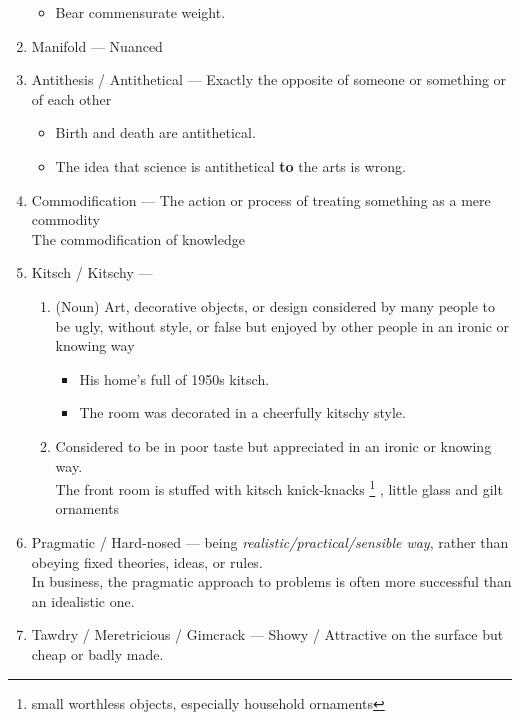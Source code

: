 \documentclass[oneside]{book}
\begin{document}
\begin{enumerate}
\begin{itemize}
        \item Bear commensurate weight.
    \end{itemize}
    \item Manifold --- Nuanced
    \item Antithesis / Antithetical --- Exactly the opposite of someone or something or of each other 
    \footnotesize \begin{itemize}
        \item Birth and death are antithetical.
        \item The idea that science is antithetical \textbf{to} the arts is wrong.
        \end{itemize} \normalsize
        \item Commodification --- The action or process of treating something as a mere commodity\\
        \footnotesize The commodification of knowledge \normalsize
        \item Kitsch / Kitschy --- 
        \begin{enumerate} \normalsize
            \item (Noun) Art, decorative objects, or design considered by many people to be ugly, without style, or false but enjoyed by other people in an ironic or knowing way\\
            \footnotesize \begin{itemize}
                \item His home's full of 1950s kitsch.
                \item The room was decorated in a cheerfully kitschy style.
            \end{itemize} \normalsize
            \item Considered to be in poor taste but appreciated in an ironic or knowing way.\\
            \footnotesize The front room is stuffed with kitsch knick-knacks \footnote{small worthless objects, especially household ornaments} , little glass and gilt ornaments \normalsize
        \end{enumerate}
        \item Pragmatic / Hard-nosed --- being \emph{realistic/practical/sensible way}, rather than obeying fixed theories, ideas, or rules.\\
        \footnotesize In business, the pragmatic approach to problems is often more successful than an idealistic one. \normalsize 
        \item Tawdry / Meretricious / Gimcrack --- Showy / Attractive on the surface but cheap or badly made.

\end{enumerate}
\end{document}
